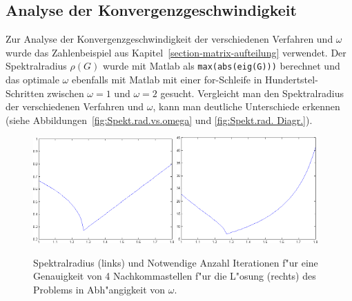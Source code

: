 \begin{refsection}
\subsection{Analyse der Konvergenzgeschwindigkeit \label{subsec: Konv.geschw.analyse}}
Zur Analyse der Konvergenzgeschwindigkeit der verschiedenen
Verfahren und $\omega$ wurde das Zahlenbeispiel aus
Kapitel~\ref{section-matrix-aufteilung} verwendet.
Der Spektralradius $\rho(G)$ wurde mit Matlab als
\texttt{max(abs(eig(G)))} berechnet und das optimale $\omega$ ebenfalls
mit Matlab mit einer for-Schleife in Hundertstel-Schritten
zwischen $\omega=1$ und $\omega=2$ gesucht.
Vergleicht man den Spektralradius der verschiedenen Verfahren und
$\omega$, kann man deutliche Unterschiede erkennen (siehe
Abbildungen~\ref{fig:Spekt.rad.vs.omega}
und \ref{fig:Spekt.rad. Diagr.}).
\begin{figure}\centering
\includegraphics[width=0.48\textwidth]{sor/img/Spektralradius.png}
\hfill
\includegraphics[width=0.48\textwidth]{sor/img/NumIt.png}
\caption{Spektralradius (links) und
Notwendige Anzahl Iterationen f"ur  eine Genauigkeit von 4 Nachkommastellen
f"ur die L"osung (rechts)
des Problems in Abh"angigkeit von $\omega$.
\label{fig:Spekt.rad.vs.omega}
\label{fig:Spekt.rad.vs.Anz.It.}
}
\end{figure}


\end{refsection}
